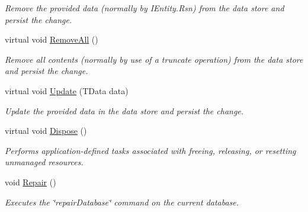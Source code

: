 \begin{DoxyCompactItemize}
\begin{DoxyCompactList}\small\item\em Remove the provided {\itshape data}  (normally by I\+Entity.\+Rsn) from the data store and persist the change. \end{DoxyCompactList}\item 
virtual void \hyperlink{classCqrs_1_1MongoDB_1_1DataStores_1_1MongoDbDataStore_ac0cb8626e8f8ab0275a31e88a920ee3e_ac0cb8626e8f8ab0275a31e88a920ee3e}{Remove\+All} ()
\begin{DoxyCompactList}\small\item\em Remove all contents (normally by use of a truncate operation) from the data store and persist the change. \end{DoxyCompactList}\item 
virtual void \hyperlink{classCqrs_1_1MongoDB_1_1DataStores_1_1MongoDbDataStore_af86a3df56e2df92fb9ef880ff4fa5f16_af86a3df56e2df92fb9ef880ff4fa5f16}{Update} (T\+Data data)
\begin{DoxyCompactList}\small\item\em Update the provided {\itshape data}  in the data store and persist the change. \end{DoxyCompactList}\item 
virtual void \hyperlink{classCqrs_1_1MongoDB_1_1DataStores_1_1MongoDbDataStore_a5003aba35b02f686cbacf5832a14cf46_a5003aba35b02f686cbacf5832a14cf46}{Dispose} ()
\begin{DoxyCompactList}\small\item\em Performs application-\/defined tasks associated with freeing, releasing, or resetting unmanaged resources. \end{DoxyCompactList}\item 
void \hyperlink{classCqrs_1_1MongoDB_1_1DataStores_1_1MongoDbDataStore_a2fef1856a801d2f247ed5b0a0f3bea9a_a2fef1856a801d2f247ed5b0a0f3bea9a}{Repair} ()
\begin{DoxyCompactList}\small\item\em Executes the \char`\"{}repair\+Database\char`\"{} command on the current database. \end{DoxyCompactList}\end{DoxyCompactItemize}
